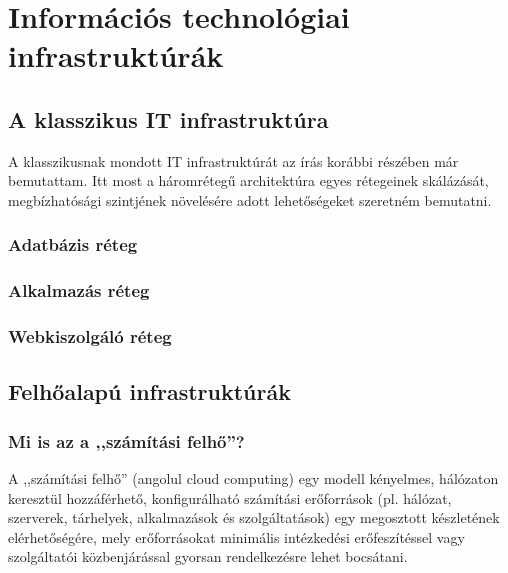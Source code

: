 \chapter{Információs technológiai infrastruktúrák}
\section{A klasszikus IT infrastruktúra}
A klasszikusnak mondott IT infrastruktúrát az írás korábbi részében már bemutattam. Itt most a háromrétegű architektúra egyes rétegeinek skálázását, megbízhatósági szintjének növelésére adott lehetőségeket szeretném bemutatni.
\subsection{Adatbázis réteg}
\subsection{Alkalmazás réteg}
\subsection{Webkiszolgáló réteg}
\section{Felhőalapú infrastruktúrák}
\subsection{Mi is az a ,,számítási felhő''?}

A ,,számítási felhő'' (angolul \foreignlanguage{english}{cloud computing}) egy modell kényelmes, hálózaton keresztül hozzáférhető, konfigurálható számítási erőforrások (pl. hálózat, szerverek, tárhelyek, alkalmazások és szolgáltatások) egy megosztott készletének elérhetőségére, mely erőforrásokat minimális intézkedési erőfeszítéssel vagy szolgáltatói közbenjárással gyorsan rendelkezésre lehet bocsátani.

